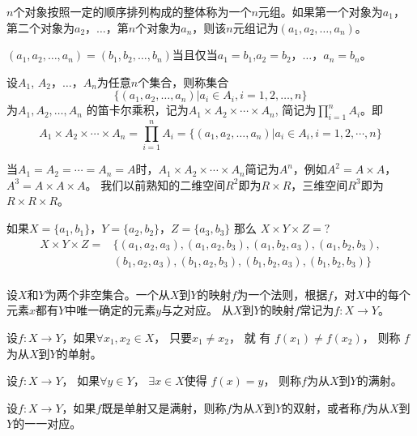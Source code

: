   \begin{Def}
    $n$个对象按照一定的顺序排列构成的整体称为一个$n$元组。如果第一个对象为$a_1$，第二个对象为$a_2$，$\ldots$，第$n$个对象为$a_n$，则该$n$元组记为$(a_1,a_2, \ldots, a_n)$。

 $(a_1,a_2, \ldots, a_n)=(b_1,b_2, \ldots, b_n)$当且仅当$a_1=b_1$,$a_2=b_2$，$\ldots$，$a_n=b_n$。
  \end{Def}
  \begin{Def}
    设$A_1$, $A_2$，$\ldots$，$A_n$为任意$n$个集合，则称集合 \[\{(a_1,a_2, \ldots, a_n)|a_i\in A_i, i = 1,2,\ldots, n\}\] 为$A_1, A_2, \ldots, A_n$ 的笛卡尔乘积，记为$A_1 \times A_2 \times \cdots \times A_n$, 简记为$\prod_{i=1}^nA_i$。即
\begin{equation*}
  A_1 \times A_2 \times \cdots \times A_n = \prod_{i=1}^nA_i = \{(a_1,a_2, \ldots, a_n)|a_i \in A_i, i = 1, 2, \cdots, n\}
\end{equation*}

当$A_1=A_2=\cdots=A_n=A$时，$A_1 \times A_2\times \cdots \times A_n$简记为$A^n$，例如$A^2=A\times A$，$A^3=A\times A\times A$。
我们以前熟知的二维空间$R^2$即为$R\times R$，三维空间$R^3$即为$R\times R\times R$。

  \end{Def}
  \begin{Example}
    如果$X=\{a_1,b_1\}$，$Y=\{a_2,b_2\}$，$Z=\{a_3,b_3\}$ 那么 $X \times Y \times Z = ?$
    \begin{equation*}
      \begin{split}
       X \times Y \times Z =& \{ (a_1,a_2, a_3), (a_1,a_2, b_3), (a_1, b_2, a_3), (a_1,b_2, b_3), \\
&(b_1, a_2, a_3), (b_1, a_2, b_3), (b_1, b_2, a_3), (b_1, b_2, b_3) \}\\
      \end{split}
    \end{equation*}
  \end{Example}

  \begin{Def}
    设$X$和$Y$为两个非空集合。一个从$X$到$Y$的映射$f$为一个法则，根据$f$，对$X$中的每个元素$x$都有$Y$中唯一确定的元素$y$与之对应。
    从$X$到$Y$的映射$f$常记为$f:X\to Y$。
  \end{Def}
    \begin{Def}
    设$f:X\to Y$，如果$\forall x_1, x_2 \in X$， 只要$x_1 \neq x_2$，  就 有 $f(x_1) \neq f(x_2)$，   则称 $f$为从$X$到$Y$的单射。
  \end{Def}
  \begin{Def}
    设$f:X\to Y$， 如果$\forall y \in Y$， $\exists x \in X$使得 $f(x) = y$， 则称$f$为从$X$到$Y$的满射。
  \end{Def}
  \begin{Def}
    设$f:X\to Y$，如果$f$既是单射又是满射，则称$f$为从$X$到$Y$的双射，或者称$f$为从$X$到$Y$的一一对应。
  \end{Def}

